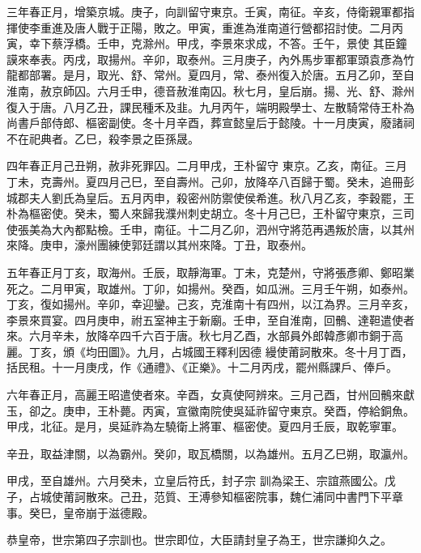 \begin{pinyinscope}
 三年春正月，增築京城。庚子，向訓留守東京。壬寅，南征。辛亥，侍衛親軍都指揮使李重進及唐人戰于正陽，敗之。甲寅，重進為淮南道行營都招討使。二月丙寅，幸下蔡浮橋。壬申，克滁州。甲戌，李景來求成，不答。壬午，景使
 其臣鐘謨來奉表。丙戌，取揚州。辛卯，取泰州。三月庚子，內外馬步軍都軍頭袁彥為竹龍都部署。是月，取光、舒、常州。夏四月，常、泰州復入於唐。五月乙卯，至自淮南，赦京師囚。六月壬申，德音赦淮南囚。秋七月，皇后崩。揚、光、舒、滁州復入于唐。八月乙丑，課民種禾及韭。九月丙午，端明殿學士、左散騎常侍王朴為尚書戶部侍郎、樞密副使。冬十月辛酉，葬宣懿皇后于懿陵。十一月庚寅，廢諸祠不在祀典者。乙巳，殺李景之臣孫晟。



 四年春正月己丑朔，赦非死罪囚。二月甲戌，王朴留守
 東京。乙亥，南征。三月丁未，克壽州。夏四月己巳，至自壽州。己卯，放降卒八百歸于蜀。癸未，追冊彭城郡夫人劉氏為皇后。五月丙申，殺密州防禦使侯希進。秋八月乙亥，李穀罷，王朴為樞密使。癸未，蜀人來歸我濮州刺史胡立。冬十月己巳，王朴留守東京，三司使張美為大內都點檢。壬申，南征。十二月乙卯，泗州守將范再遇叛於唐，以其州來降。庚申，濠州團練使郭廷謂以其州來降。丁丑，取泰州。



 五年春正月丁亥，取海州。壬辰，取靜海軍。丁未，克楚州，守將張彥卿、鄭昭業死之。二月甲寅，取雄州。丁卯，如揚州。癸酉，如瓜洲。三月壬午朔，如泰州。丁亥，復如揚州。辛卯，幸迎鑾。己亥，克淮南十有四州，以江為界。三月辛亥，李景來買宴。四月庚申，祔五室神主于新廟。壬申，至自淮南，回鶻、達靼遣使者來。六月辛未，放降卒四千六百于唐。秋七月乙酉，水部員外郎韓彥卿市銅于高麗。丁亥，頒《均田圖》。九月，占城國王釋利因德
 縵使莆訶散來。冬十月丁酉，括民租。十一月庚戌，作《通禮》、《正樂》。十二月丙戌，罷州縣課戶、俸戶。



 六年春正月，高麗王昭遣使者來。辛酉，女真使阿辨來。三月己酉，甘州回鶻來獻玉，卻之。庚申，王朴薨。丙寅，宣徽南院使吳延祚留守東京。癸酉，停給銅魚。甲戌，北征。是月，吳延祚為左驍衛上將軍、樞密使。夏四月壬辰，取乾寧軍。



 辛丑，取益津關，以為霸州。癸卯，取瓦橋關，以為雄州。五月乙巳朔，取瀛州。



 甲戌，至自雄州。六月癸未，立皇后符氏，封子宗
 訓為梁王、宗誼燕國公。戊子，占城使莆訶散來。己丑，范質、王溥參知樞密院事，魏仁浦同中書門下平章事。癸巳，皇帝崩于滋德殿。



 恭皇帝，世宗第四子宗訓也。世宗即位，大臣請封皇子為王，世宗謙抑久之。




\end{pinyinscope}
